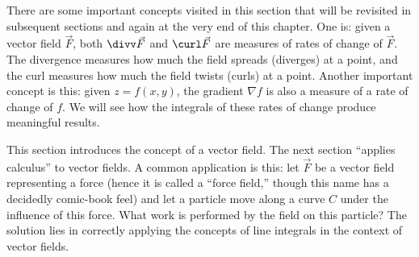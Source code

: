 There are some important concepts visited in this section that will be revisited in subsequent sections and again at the very end of this chapter. One is: given a vector field $\vec F$, both $\divv\vec F$ and $\curl\vec F$ are measures of rates of change of $\vec F$. The divergence measures how much the field spreads (diverges) at a point, and the curl measures how much the field twists (curls) at a point. Another important concept is this: given $z=f(x,y)$, the gradient $\nabla f$ is also a measure of a rate of change of $f$. We will see how the integrals of these rates of change produce meaningful results.

This section introduces the concept of a vector field. The next section ``applies calculus'' to vector fields. A common application is this: let $\vec F$ be a vector field representing a force (hence it is called a ``force field,'' though this name has a decidedly comic-book feel) and let a particle move along a curve $C$ under the influence of this force. What work is performed by the field on this particle? The solution lies in correctly applying the concepts of line integrals in the context of vector fields.


